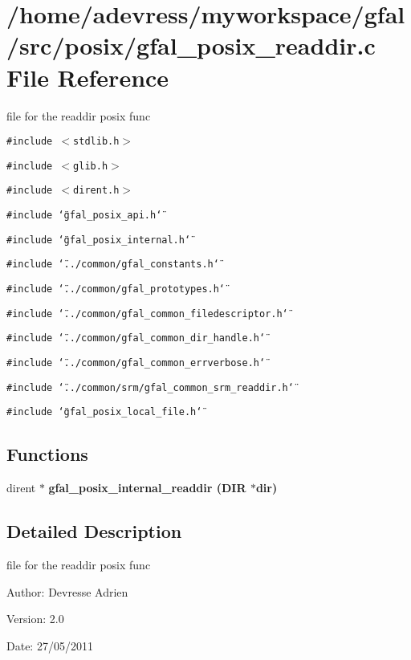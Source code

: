 \section{/home/adevress/myworkspace/gfal/src/posix/gfal\_\-posix\_\-readdir.c File Reference}
\label{gfal__posix__readdir_8c}
file for the readdir posix func 

{\tt \#include $<$stdlib.h$>$}\par
{\tt \#include $<$glib.h$>$}\par
{\tt \#include $<$dirent.h$>$}\par
{\tt \#include \char`\"{}gfal\_\-posix\_\-api.h\char`\"{}}\par
{\tt \#include \char`\"{}gfal\_\-posix\_\-internal.h\char`\"{}}\par
{\tt \#include \char`\"{}../common/gfal\_\-constants.h\char`\"{}}\par
{\tt \#include \char`\"{}../common/gfal\_\-prototypes.h\char`\"{}}\par
{\tt \#include \char`\"{}../common/gfal\_\-common\_\-filedescriptor.h\char`\"{}}\par
{\tt \#include \char`\"{}../common/gfal\_\-common\_\-dir\_\-handle.h\char`\"{}}\par
{\tt \#include \char`\"{}../common/gfal\_\-common\_\-errverbose.h\char`\"{}}\par
{\tt \#include \char`\"{}../common/srm/gfal\_\-common\_\-srm\_\-readdir.h\char`\"{}}\par
{\tt \#include \char`\"{}gfal\_\-posix\_\-local\_\-file.h\char`\"{}}\par
\subsection*{Functions}
\begin{CompactItemize}
\item 
dirent $\ast$ \bf{gfal\_\-posix\_\-internal\_\-readdir} (DIR $\ast$dir)
\end{CompactItemize}


\subsection{Detailed Description}
file for the readdir posix func 

\begin{Desc}
\item[Author:]Devresse Adrien \end{Desc}
\begin{Desc}
\item[Version:]2.0 \end{Desc}
\begin{Desc}
\item[Date:]27/05/2011 \end{Desc}


